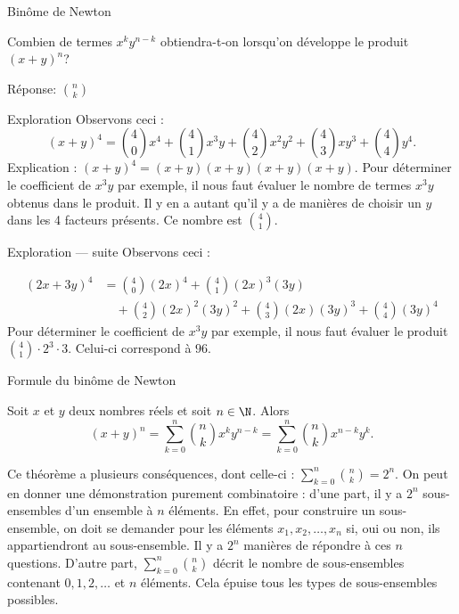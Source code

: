 \documentclass[nuit,charter,pied]{BeamerJS}
\begin{document}
\begin{frame}{Binôme de Newton}
\pause
\begin{ex}
Combien de termes \(x^k y^{n-k}\) obtiendra-t-on lorsqu'on développe le produit \((x+y)^n\)?
\end{ex}
\pause
{\color{black!60}Réponse: \(\binom{n}{k}\)}
\end{frame}
\begin{frame}{Exploration}
\pause
Observons ceci :
\[(x+y)^4=\binom{4}{0}x^4 + \binom{4}{1}x^3 y + \binom{4}{2}x^2 y^2 + \binom{4}{3}x y^3 + \binom{4}{4}y^4.\]
\pause
Explication : \((x+y)^4=(x+y)(x+y)(x+y)(x+y).\)
Pour déterminer le coefficient de \(x^3 y\) par exemple, il nous faut évaluer le nombre de termes \(x^3 y\) obtenus dans le produit. Il y en a autant qu'il y a de manières de choisir un \(y\) dans les 4 facteurs présents. Ce nombre est \(\binom{4}{1}\).
\end{frame}
\begin{frame}{Exploration --- suite}
Observons ceci :

\begin{align*}
(2x+3y)^4&=\binom{4}{0}(2x)^4 + \binom{4}{1}(2x)^3 (3y) \\
&\quad+ \binom{4}{2}(2x)^2 (3y)^2 + \binom{4}{3}(2x) (3y)^3 + \binom{4}{4}(3y)^4
\end{align*}
\pause
Pour déterminer le coefficient de \(x^3 y\) par exemple, il nous faut évaluer le produit \(\binom{4}{1}\cdot 2^3\cdot 3\). Celui-ci correspond à \(96\).
\end{frame}
\begin{frame}{Formule du binôme de Newton}
\pause
	\begin{thm}{}
		Soit \(x\) et \(y\) deux nombres réels et soit \(n\in\N\). Alors 
\[(x+y)^{n}=\sum _{k=0}^{n}\binom{n}{k}x^{k}y^{n-k}=\sum _{k=0}^{n}\binom{n}{k}x^{n-k}y^{k}.\]
	\end{thm}
	\pause
	Ce théorème a plusieurs conséquences, dont celle-ci : \(\sum _{k=0}^{n}\binom{n}{k}=2^n\).
	\pause
	On peut en donner une démonstration purement combinatoire : d'une part, il y a \(2^n\) sous-ensembles d'un ensemble à \(n\) éléments. En effet, pour construire un sous-ensemble, on doit se demander pour les éléments \(x_1,x_2,\ldots, x_n\) si, oui ou non, ils appartiendront au sous-ensemble. Il y a \(2^n\) manières de répondre à ces \(n\) questions. D'autre part, \(\sum _{k=0}^{n}\binom{n}{k}\) décrit le nombre de sous-ensembles contenant \(0, 1, 2, \ldots\) et  \(n\) éléments. Cela épuise tous les types de sous-ensembles possibles.
\end{frame}
\end{document}
